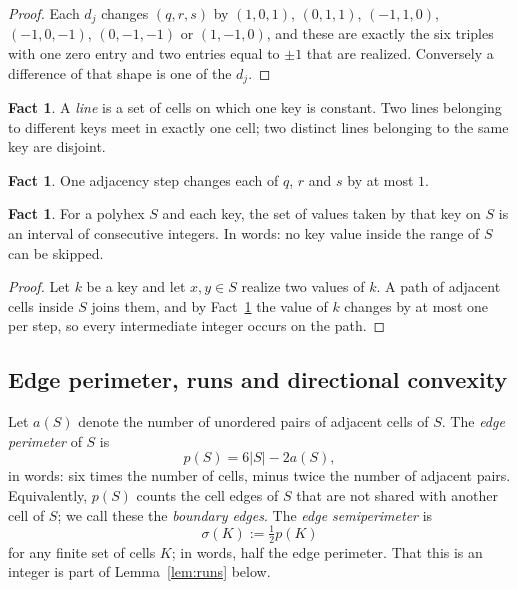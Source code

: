\documentclass[11pt]{article}
\theoremstyle{plain}
\theoremstyle{definition}
\newtheorem{fact}[theorem]{Fact}
\theoremstyle{remark}
\begin{document}
\begin{proof}
Each \(d_{j}\) changes \((q,r,s)\) by \((1,0,1)\), \((0,1,1)\), \((-1,1,0)\),
\((-1,0,-1)\), \((0,-1,-1)\) or \((1,-1,0)\), and these are exactly the six triples with
one zero entry and two entries equal to \(\pm1\) that are realized. Conversely a
difference of that shape is one of the \(d_{j}\).
\end{proof}

\begin{fact}\label{f:2}
A \emph{line} is a set of cells on which one key is constant. Two lines belonging to
different keys meet in exactly one cell; two distinct lines belonging to the same key are
disjoint.
\end{fact}

\begin{fact}\label{f:3}
One adjacency step changes each of \(q\), \(r\) and \(s\) by at most \(1\).
\end{fact}

\begin{fact}\label{f:4}
For a polyhex \(S\) and each key, the set of values taken by that key on \(S\) is an
interval of consecutive integers. In words: no key value inside the range of \(S\) can be
skipped.
\end{fact}

\begin{proof}
Let \(k\) be a key and let \(x,y\in S\) realize two values of \(k\). A path of adjacent
cells inside \(S\) joins them, and by Fact~\ref{f:3} the value of \(k\) changes by at most
one per step, so every intermediate integer occurs on the path.
\end{proof}

\subsection{Edge perimeter, runs and directional convexity}\label{sec:2.2}

Let \(a(S)\) denote the number of unordered pairs of adjacent cells of \(S\). The
\emph{edge perimeter} of \(S\) is
\begin{equation}\label{eq:p}
   p(S)=6|S|-2a(S),
\end{equation}
in words: six times the number of cells, minus twice the number of adjacent pairs.
Equivalently, \(p(S)\) counts the cell edges of \(S\) that are not shared with another
cell of \(S\); we call these the \emph{boundary edges}. The \emph{edge semiperimeter} is
\[
   \sigma(K):=\tfrac{1}{2}p(K)
\]
for any finite set of cells \(K\); in words, half the edge perimeter. That this is an
integer is part of Lemma~\ref{lem:runs} below.
\end{document}
